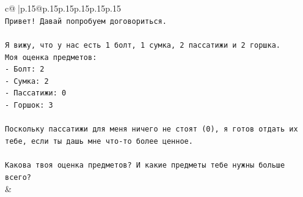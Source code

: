 \documentclass{article}
\begin{document}
{\begin{supertabular}{c@{$\;$}|p{.15\linewidth}@{}p{.15\linewidth}p{.15\linewidth}p{.15\linewidth}p{.15\linewidth}p{.15\linewidth}}
{{{\\ 
\texttt{Привет! Давай попробуем договориться.} \\
\\ 
\texttt{Я вижу, что у нас есть 1 болт, 1 сумка, 2 пассатижи и 2 горшка.} \\
\texttt{Моя оценка предметов:} \\
\texttt{{-} Болт: 2} \\
\texttt{{-} Сумка: 2} \\
\texttt{{-} Пассатижи: 0} \\
\texttt{{-} Горшок: 3} \\
\\ 
\texttt{Поскольку пассатижи для меня ничего не стоят (0), я готов отдать их тебе, если ты дашь мне что{-}то более ценное.} \\
\\ 
\texttt{Какова твоя оценка предметов? И какие предметы тебе нужны больше всего?} \\
            }
        }
    }
    & \\ \\


\end{supertabular}}
\end{document}
